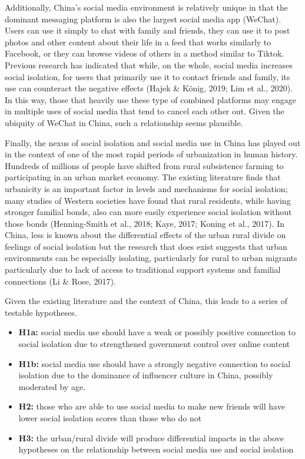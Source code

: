 \documentclass[]{interact}
\theoremstyle{plain}%
\theoremstyle{definition}
\theoremstyle{remark}
\begin{document}
Additionally, China's social media environment is relatively unique in
that the dominant messaging platform is also the largest social media
app (WeChat). Users can use it simply to chat with family and friends,
they can use it to post photos and other content about their life in a
feed that works similarly to Facebook, or they can browse videos of
others in a method similar to Tiktok. Previous research has indicated
that while, on the whole, social media increases social isolation, for
users that primarily use it to contact friends and family, its use can
counteract the negative effects (Hajek \& König, 2019; Lim et al.,
2020). In this way, those that heavily use these type of combined
platforms may engage in multiple uses of social media that tend to
cancel each other out. Given the ubiquity of WeChat in China, such a
relationship seems plausible.

Finally, the nexus of social isolation and social media use in China has
played out in the context of one of the most rapid periods of
urbanization in human history. Hundreds of millions of people have
shifted from rural subsistence farming to participating in an urban
market economy. The existing literature finds that urbanicity is an
important factor in levels and mechanisms for social isolation; many
studies of Western societies have found that rural residents, while
having stronger familial bonds, also can more easily experience social
isolation without those bonds (Henning-Smith et al., 2018; Kaye, 2017;
Koning et al., 2017). In China, less is known about the differential
effects of the urban rural divide on feelings of social isolation but
the research that does exist suggests that urban environments can be
especially isolating, particularly for rural to urban migrants
particularly due to lack of access to traditional support systems and
familial connections (Li \& Rose, 2017).

Given the existing literature and the context of China, this leads to a
series of testable hypotheses.

\begin{itemize}
\item
  \textbf{H1a:} social media use should have a weak or possibly positive
  connection to social isolation due to strengthened government control
  over online content
\item
  \textbf{H1b:} social media use should have a strongly negative
  connection to social isolation due to the dominance of influencer
  culture in China, possibly moderated by age.
\item
  \textbf{H2:} those who are able to use social media to make new
  friends will have lower social isolation scores than those who do not
\item
  \textbf{H3:} the urban/rural divide will produce differential impacts
  in the above hypotheses on the relationship between social media use
  and social isolation
\end{itemize}
\end{document}
